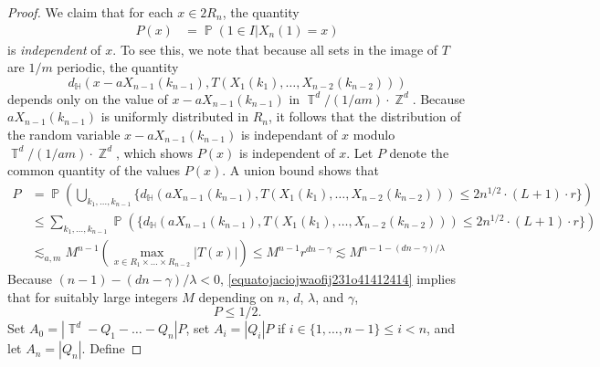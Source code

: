 \documentclass[dvipsnames,letterpaper,12pt]{article}
\numberwithin{equation}{section}
\DeclareMathOperator{\ZZ}{\mathbb{Z}}
\DeclareMathOperator{\TT}{\mathbb{T}}
\numberwithin{theorem}{section}
\DeclareMathOperator{\PP}{\mathbb{P}}
\begin{document}
\begin{proof}
    We claim that for each $x \in 2R_n$, the quantity
    \begin{align*}
        P(x) &= \PP ( 1 \in I | X_n(1) = x)%
    \end{align*}
    is \emph{independent} of $x$. To see this, we note that because all sets in the image of $T$ are $1/m$ periodic, the quantity
    \[ d_{\mathbb{H}}(x - a X_{n-1}(k_{n-1}), T(X_1(k_1),\dots, X_{n-2}(k_{n-2}))) \]
    depends only on the value of $x - a X_{n-1}(k_{n-1})$ in $\TT^d / (1/am) \cdot \ZZ^d$. Because $a X_{n-1}(k_{n-1})$ is uniformly distributed in $R_n$, it follows that the distribution of the random variable $x - a X_{n-1}(k_{n-1})$ is independant of $x$ modulo $\TT^d / (1/am) \cdot \ZZ^d$, which shows $P(x)$ is independent of $x$. Let $P$ denote the common quantity of the values $P(x)$. A union bound shows that
    \begin{equation} \label{equatojaciojwaofij231o41412414}
    \begin{split}
        P &= \PP \left( \bigcup_{k_1,\dots,k_{n-1}} \Big\{ d_{\mathbb{H}}(a X_{n-1}(k_{n-1}), T(X_1(k_1),\dots, X_{n-2}(k_{n-2}))) \leq 2 n^{1/2} \cdot (L+1) \cdot r \Big\} \right)\\
        &\leq \sum_{k_1,\dots,k_{n-1}} \PP \left( \Big\{ d_{\mathbb{H}}(a X_{n-1}(k_{n-1}), T(X_1(k_1),\dots, X_{n-2}(k_{n-2}))) \leq 2 n^{1/2} \cdot (L+1) \cdot r \Big\} \right) \\
        &\lesssim_{a,m} M^{n-1} \left( \max_{x \in R_1 \times \dots \times R_{n-2}} |T(x)| \right) \leq M^{n-1} r^{dn-\gamma} \lesssim M^{n - 1 - (dn - \gamma)/\lambda}
    \end{split}
    \end{equation}
    Because $(n-1) - (dn - \gamma)/\lambda < 0$, \eqref{equatojaciojwaofij231o41412414} implies that for suitably large integers $M$ depending on $n$, $d$, $\lambda$, and $\gamma$,
    \begin{equation}
        P \leq 1/2.
    \end{equation}
    Set $A_0 = |\TT^d - Q_1 - \dots - Q_n| P$, set $A_i = |Q_i| P$ if $i \in \{ 1, \dots, n - 1 \} \leq i < n$, and let $A_n = |Q_n|$. Define

\end{proof}
\end{document}
